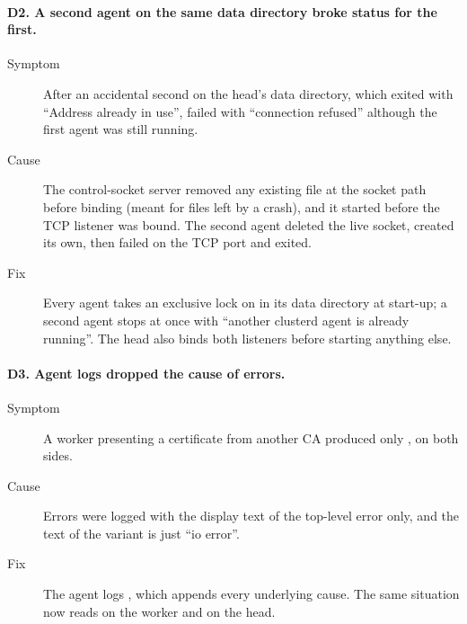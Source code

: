 \documentclass{article}
\begin{document}
\paragraph{D2. A second agent on the same data directory broke status for the first.}
\begin{description}
  \item[Symptom] After an accidental second  on
    the head's data directory, which exited with ``Address already in
    use'',  failed with ``connection refused'' although the
    first agent was still running.
  \item[Cause] The control-socket server removed any existing file at the
    socket path before binding (meant for files left by a crash), and it
    started before the TCP listener was bound. The second agent deleted the
    live socket, created its own, then failed on the TCP port and exited.
  \item[Fix] Every agent takes an exclusive lock on 
    in its data directory at start-up; a second agent stops at once with
    ``another clusterd agent is already running''. The head also binds
    both listeners before starting anything else.
\end{description}

\paragraph{D3. Agent logs dropped the cause of errors.}
\begin{description}
  \item[Symptom] A worker presenting a certificate from another CA produced
    only , on both sides.
  \item[Cause] Errors were logged with the display text of the top-level
    error only, and the text of the  variant is just ``io
    error''.
  \item[Fix] The agent logs , which appends every
    underlying cause. The same situation now reads
     on the worker
    and  on the head.
\end{description}
\end{document}
